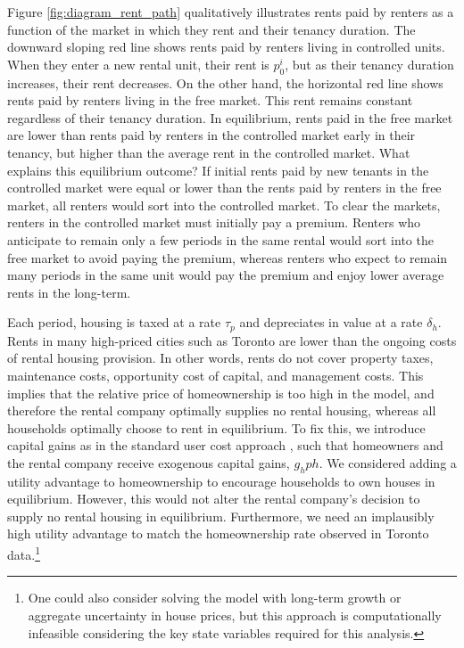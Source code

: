 \documentclass[parskip=full]{article}
\begin{document}
Figure \ref{fig:diagram_rent_path} qualitatively illustrates rents paid by renters as a function of the market in which they rent and their tenancy duration. The downward sloping red line shows rents paid by renters living in controlled units. When they enter a new rental unit, their rent is $p^{i}_{0}$, but as their tenancy duration increases, their rent decreases. On the other hand, the horizontal red line shows rents paid by renters living in the free market. This rent remains constant regardless of their tenancy duration. In equilibrium, rents paid in the free market are lower than rents paid by renters in the controlled market early in their tenancy, but higher than the average rent in the controlled market. What explains this equilibrium outcome? If initial rents paid by new tenants in the controlled market were equal or lower than the rents paid by renters in the free market, all renters would sort into the controlled market. To clear the markets, renters in the controlled market must initially pay a premium. Renters who anticipate to remain only a few periods in the same rental would sort into the free market to avoid paying the premium, whereas renters who expect to remain many periods in the same unit would pay the premium and enjoy lower average rents in the long-term.

Each period, housing is taxed at a rate $\tau_{p}$ and depreciates in value at a rate $\delta_h$. Rents in many high-priced cities such as Toronto are lower than the ongoing costs of rental housing provision. In other words, rents do not cover property taxes, maintenance costs, opportunity cost of capital, and management costs. This implies that the relative price of homeownership is too high in the model, and therefore the rental company optimally supplies no rental housing, whereas all households optimally choose to rent in equilibrium. To fix this, we introduce capital gains as in the standard user cost approach \citep{himmbelbergetal-2005}, such that homeowners and the rental company receive exogenous capital gains, $g_{h}ph$. We considered adding a utility advantage to homeownership to encourage households to own houses in equilibrium. However, this would not alter the rental company's decision to supply no rental housing in equilibrium. Furthermore, we need an implausibly high utility advantage to match the homeownership rate observed in Toronto data.\footnote{One could also consider solving the model with long-term growth or aggregate uncertainty in house prices, but this approach is computationally infeasible considering the key state variables required for this analysis.}
\end{document}
